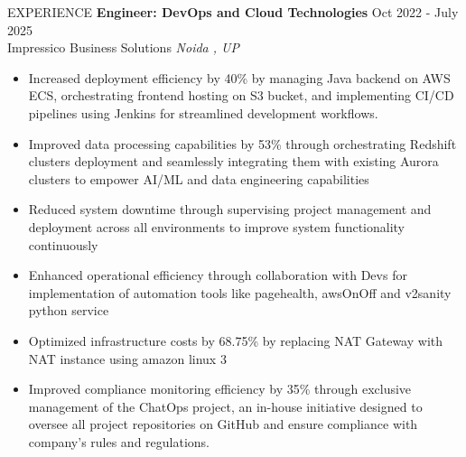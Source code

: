 \documentclass{resume} %
\begin{document}
\begin{rSection}{EXPERIENCE}
\textbf{Engineer: DevOps and Cloud Technologies} \hfill Oct 2022 - July 2025\\
Impressico Business Solutions \hfill \textit{Noida , UP}
 \begin{itemize}
    \itemsep -3pt {} 
     \item Increased deployment efficiency by 40\% by managing Java backend on AWS ECS, orchestrating frontend hosting on S3 bucket, and implementing CI/CD pipelines using Jenkins for streamlined development workflows.
     \item Improved data processing capabilities by 53\% through orchestrating Redshift clusters deployment and seamlessly integrating them with existing Aurora clusters to empower AI/ML and data engineering capabilities
     \item Reduced system downtime through supervising project management and deployment across all environments to improve system functionality continuously
     \item Enhanced operational efficiency through collaboration with Devs for implementation of automation tools like pagehealth, awsOnOff and v2sanity python service
     \item Optimized infrastructure costs by 68.75\% by replacing NAT Gateway with NAT instance using amazon linux 3
     \item Improved compliance monitoring efficiency by 35\% through exclusive management of the ChatOps project, an in-house initiative designed to oversee all project repositories on GitHub and ensure compliance with company's rules and regulations.
 \end{itemize}

\end{rSection} 
\end{document}
